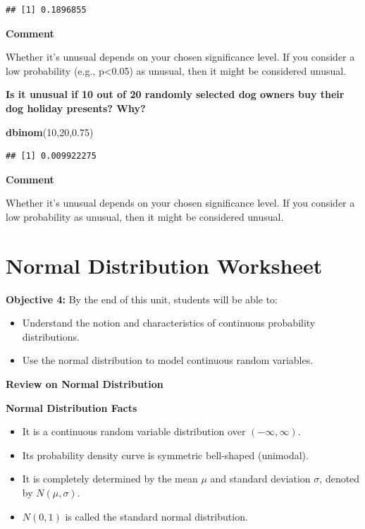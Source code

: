 \documentclass[
]{book}
\newenvironment{Shaded}{\begin{snugshade}}{\end{snugshade}}
\newcommand{\DecValTok}[1]{\textcolor[rgb]{0.00,0.00,0.81}{#1}}
\newcommand{\FloatTok}[1]{\textcolor[rgb]{0.00,0.00,0.81}{#1}}
\newcommand{\FunctionTok}[1]{\textcolor[rgb]{0.13,0.29,0.53}{\textbf{#1}}}
\newcommand{\NormalTok}[1]{#1}
\providecommand{\tightlist}{%
  \setlength{\itemsep}{0pt}\setlength{\parskip}{0pt}}
\begin{document}
\begin{verbatim}
## [1] 0.1896855
\end{verbatim}

\textbf{Comment}

Whether it's unusual depends on your chosen significance level. If you consider a low probability (e.g., p\textless0.05) as unusual, then it might be considered unusual.

\textbf{Is it unusual if 10 out of 20 randomly selected dog owners buy their dog holiday presents? Why?}

\begin{Shaded}
\begin{Highlighting}[]
\FunctionTok{dbinom}\NormalTok{(}\DecValTok{10}\NormalTok{,}\DecValTok{20}\NormalTok{,}\FloatTok{0.75}\NormalTok{)}
\end{Highlighting}
\end{Shaded}

\begin{verbatim}
## [1] 0.009922275
\end{verbatim}

\textbf{Comment}

Whether it's unusual depends on your chosen significance level. If you consider a low probability as unusual, then it might be considered unusual.

\section{Normal Distribution Worksheet}\label{normal-distribution-worksheet}

\textbf{Objective 4:} By the end of this unit, students will be able to:

\begin{itemize}
\tightlist
\item
  Understand the notion and characteristics of continuous probability distributions.
\item
  Use the normal distribution to model continuous random variables.
\end{itemize}

\textbf{Review on Normal Distribution}

\textbf{Normal Distribution Facts}

\begin{itemize}
\tightlist
\item
  It is a continuous random variable distribution over \((-\infty, \infty)\).
\item
  Its probability density curve is symmetric bell-shaped (unimodal).
\item
  It is completely determined by the mean \(\mu\) and standard deviation \(\sigma\), denoted by \(N(\mu, \sigma)\).
\item
  \(N(0, 1)\) is called the standard normal distribution.
\end{itemize}
\end{document}
